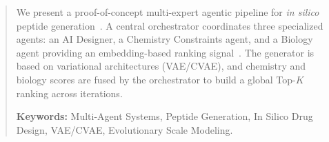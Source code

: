 \documentclass[10pt]{report}
\begin{document}


\maketitle

\begin{abstract}
We present a proof-of-concept multi-expert agentic pipeline for \textit{in silico}
peptide generation~\cite{wang2022machine}. A central orchestrator coordinates
three specialized agents: an AI Designer, a Chemistry Constraints agent, and a
Biology agent providing an embedding-based ranking signal~\cite{veltri2018deep}.
The generator is based on variational architectures (VAE/CVAE), and chemistry and biology
scores are fused by the orchestrator to build a global Top-$K$ ranking across iterations.
\par\vspace{0.5\baselineskip}
\noindent\textbf{Keywords:} Multi-Agent Systems, Peptide Generation,
In Silico Drug Design, VAE/CVAE, Evolutionary Scale Modeling.
\end{abstract}












\end{document}
